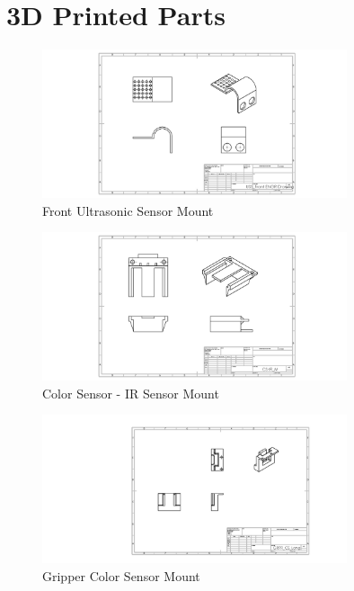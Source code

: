 \documentclass[12pt]{report}
\begin{document}
\section{3D Printed Parts}
\begin{figure}[H]
    \centering
    \includegraphics[width=0.8\textwidth]{Images/3D prints/USS_Front ENGR Drawing.JPG}
    \caption{Front Ultrasonic Sensor Mount}
    \label{fig:USS_front}
\end{figure}
\begin{figure}[H]
    \centering
    \includegraphics[width=0.8\textwidth]{Images/3D prints/CS-IR_M ENGR Drawing.JPG}
    \caption{Color Sensor - IR Sensor Mount}
    \label{fig:CS-IR mount}
\end{figure}
\begin{figure}[H]
    \centering
    \includegraphics[width=0.8\textwidth]{Images/3D prints/GRPR_CS_Long ENGR Drawing.JPG}
    \caption{Gripper Color Sensor Mount}
    \label{fig:GRPR_CS}
\end{figure}
\end{document}
